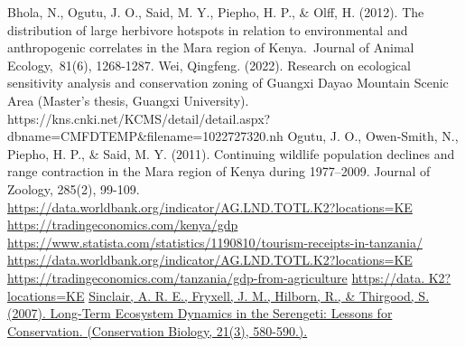 \documentclass{mcmthesis}
\numberwithin{figure}{section}
\numberwithin{table}{section}
\numberwithin{equation}{section}
\begin{document}
\begin{thebibliography}{99}
  Bhola, N., Ogutu, J. O., Said, M. Y., Piepho, H. P., \& Olff, H. (2012). The distribution of large herbivore hotspots in relation to environmental and anthropogenic correlates in the Mara region of Kenya. Journal of Animal Ecology, 81(6), 1268-1287.
  Wei, Qingfeng. (2022). Research on ecological sensitivity analysis and conservation zoning of Guangxi Dayao Mountain Scenic Area (Master's thesis, Guangxi University). https://kns.cnki.net/KCMS/detail/detail.aspx?dbname=CMFDTEMP\&filename=1022727320.nh
 Ogutu, J. O., Owen‐Smith, N., Piepho, H. P., \& Said, M. Y. (2011). Continuing wildlife population declines and range contraction in the Mara region of Kenya during 1977–2009. Journal of Zoology, 285(2), 99-109.
 \url{https://data.worldbank.org/indicator/AG.LND.TOTL.K2?locations=KE}
 \url{https://tradingeconomics.com/kenya/gdp}
 \url{https://www.statista.com/statistics/1190810/tourism-receipts-in-tanzania/}
 \url{https://data.worldbank.org/indicator/AG.LND.TOTL.K2?locations=KE}
 \url{https://tradingeconomics.com/tanzania/gdp-from-agriculture}
 \url{https://data. K2?locations=KE}
 \url{Sinclair, A. R. E., Fryxell, J. M., Hilborn, R., \& Thirgood, S. (2007). Long-Term Ecosystem Dynamics in the Serengeti: Lessons for Conservation. (Conservation Biology, 21(3), 580-590.).}
\end{thebibliography}
\end{document}
